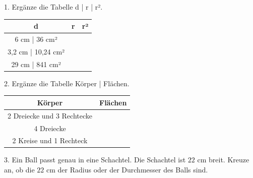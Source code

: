 \documentclass[11pt]{article}
\begin{document}
\pfheftstil
{}
\pfrueckblick
\begin{pfaufg}{}{1.}{}
Ergänze die Tabelle d | r | r².
\par\smallskip\noindent \begingroup\renewcommand{\arraystretch}{1.3}\begin{tabular}{|c|c|c|}\hline \textbf{d} & \textbf{r} & \textbf{r²} \\ \hline 6 cm | 36 cm² & \rule{0pt}{3ex}\hspace{1.6cm} & \rule{0pt}{3ex}\hspace{1.6cm} \\ \hline 3,2 cm | 10,24 cm² & \rule{0pt}{3ex}\hspace{1.6cm} & \rule{0pt}{3ex}\hspace{1.6cm} \\ \hline 29 cm | 841 cm² & \rule{0pt}{3ex}\hspace{1.6cm} & \rule{0pt}{3ex}\hspace{1.6cm} \\ \hline\end{tabular}\endgroup\par
{}
\end{pfaufg}
\begin{pfaufg}{}{2.}{}
Ergänze die Tabelle Körper | Flächen.
\par\smallskip\noindent \begingroup\renewcommand{\arraystretch}{1.3}\begin{tabular}{|c|c|}\hline \textbf{Körper} & \textbf{Flächen} \\ \hline 2 Dreiecke und 3 Rechtecke & \rule{0pt}{3ex}\hspace{1.6cm} \\ \hline 4 Dreiecke & \rule{0pt}{3ex}\hspace{1.6cm} \\ \hline 2 Kreise und 1 Rechteck & \rule{0pt}{3ex}\hspace{1.6cm} \\ \hline\end{tabular}\endgroup\par
{}
\end{pfaufg}
\pfgruppe{}
\begin{pfaufg}{}{3.}{}
Ein Ball passt genau in eine Schachtel. Die Schachtel ist $22$ cm breit. Kreuze an, ob die $22$ cm der Radius oder der Durchmesser des Balls sind.
\end{pfaufg}
\end{document}
